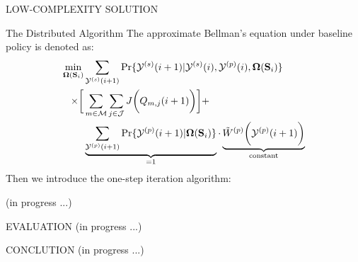\documentclass[10pt, conference, letterpaper]{IEEEtran}
\renewcommand{\vec}{\mathbf}
\DeclarePairedDelimiter{\Paren}{\bigg(}{\bigg)}
\DeclarePairedDelimiter{\Bracket}{\bigg[}{\bigg]}
\newcommand{\esSet}{\mathcal{M}}
\newcommand{\jSpace}{\mathcal{J}}
\newcommand{\Stat}{\mathbf{S}}
\newcommand{\Obsv}{\mathcal{Y}}
\newcommand{\Policy}{\mathbf{\Omega}}
\begin{document}
\begin{section}{LOW-COMPLEXITY SOLUTION}
        \begin{subsection}{The Distributed Algorithm}
            The approximate Bellman's equation under baseline policy is denoted as:
            \begin{align}
                \min_{\Policy(\Stat_i)}& \sum_{\Obsv^{(s)}(i+1)} \Pr\{\Obsv^{(s)}(i+1)|\Obsv^{(s)}(i), \Obsv^{(p)}(i), \Policy(\Stat_i)\}
                \nonumber\\
                \times \Bracket{
                    & \sum_{m\in\esSet}\sum_{j\in\jSpace} J\Paren{Q_{m,j}(i+1)}
                } +
                \nonumber\\
                & \underbrace{\sum_{\Obsv^{(p)}(i+1)} \Pr\{\Obsv^{(p)}(i+1)|\Policy(\Stat_i)\}}_{\text{=1}}
                \cdot \underbrace{\tilde{W}^{(p)} \Paren{\Obsv^{(p)}(i+1)}}_{\text{constant}}
            \end{align}
            Then we introduce the one-step iteration algorithm:
            \begin{algorithm}[H]
                \caption{Distributed Algorithm for $k$-th AP}
                \begin{algorithmic}
                    \WHILE{\TRUE}
                        \STATE (in progress ...)
                    \ENDWHILE
                \end{algorithmic}
            \end{algorithm}
        \end{subsection}
        
    \end{section}

    \begin{section}{EVALUATION}
        \label{sec:evaluation}
        (in progress ...)
    \end{section}

    \begin{section}{CONCLUTION}
        \label{sec:conclusion}
        (in progress ...)
    \end{section}
    
\end{document}
